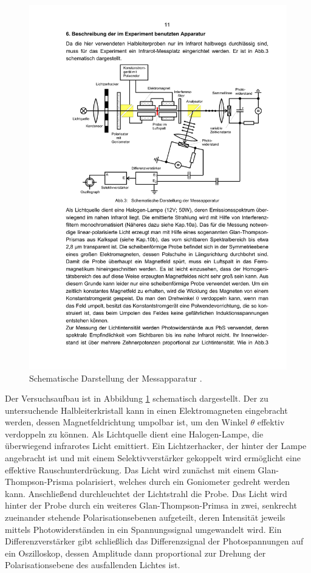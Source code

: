 \begin{figure}[h]
    \centering
    \includegraphics[width=0.9\linewidth]{img/aufbau.pdf}
    \caption{
        Schematische Darstellung der Messapparatur \cite{V46}.
    }
    \label{fig:aufbau}
\end{figure}
Der Versuchsaufbau ist in Abbildung \ref{fig:aufbau} schematisch dargestellt.
Der zu untersuchende Halbleiterkristall kann in einen Elektromagneten
eingebracht werden,
dessen Magnetfeldrichtung umpolbar ist, um den Winkel $\theta$
effektiv verdoppeln zu können.
Als Lichtquelle dient eine Halogen-Lampe, die überwiegend infrarotes Licht
emittiert.
Ein Lichtzerhacker, der hinter der Lampe angebracht ist und mit einem
Selektivverstärker gekoppelt wird ermöglicht eine effektive
Rauschunterdrückung.
Das Licht wird zunächst mit einem Glan-Thompson-Prisma polarisiert, welches
durch ein Goniometer gedreht werden kann.
Anschließend durchleuchtet der Lichtstrahl die Probe.
Das Licht wird hinter der Probe durch ein weiteres Glan-Thompson-Primsa in
zwei, senkrecht zueinander stehende Polarisationsebenen aufgeteilt, deren
Intensität jeweils mittels Photowiderständen in ein Spannungssignal
umgewandelt wird.
Ein Differenzverstärker gibt schließlich das Differenzsignal der
Photospannungen auf ein Oszilloskop, dessen Amplitude dann proportional zur
Drehung der Polarisationsebene des ausfallenden Lichtes ist.

